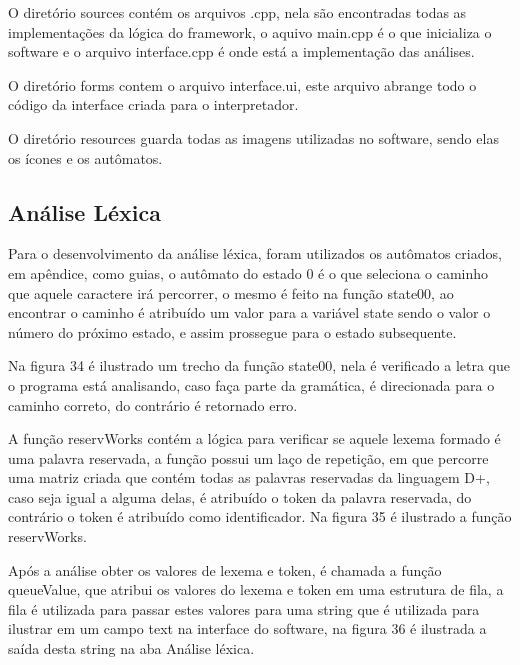 \documentclass[12pt,oneside,a4paper,chapter=TITLE,section=TITLE,sumario=tradicional]{abntex2}
\begin{document}
O diretório sources contém os arquivos .cpp, nela são encontradas todas as implementações da lógica do framework, o aquivo main.cpp é o que inicializa o software e o arquivo interface.cpp é onde está a implementação das análises.

O diretório forms contem o arquivo interface.ui, este arquivo abrange todo o código da interface criada para o interpretador.

O diretório resources guarda todas as imagens utilizadas no software, sendo elas os ícones e os autômatos.

\subsection{Análise Léxica}
\label{subsec:analiselexica}

Para o desenvolvimento da análise léxica, foram utilizados os autômatos criados, em apêndice, como guias, o autômato do estado 0 é o que seleciona o caminho que aquele caractere irá percorrer, o mesmo é feito na função state00, ao encontrar o caminho é atribuído um valor para a variável state sendo o valor o número do próximo estado, e assim prossegue para o estado subsequente.

Na figura 34 é ilustrado um trecho da função state00, nela é verificado a letra que o programa está analisando, caso faça parte da gramática, é direcionada para o caminho correto, do contrário é retornado erro.

\begin{figure}[htb]
\end{figure} 

A função reservWorks contém a lógica para verificar se aquele lexema formado é uma palavra reservada, a função possui um laço de repetição, em que percorre uma matriz criada que contém todas as palavras reservadas da linguagem D+, caso seja igual a alguma delas, é atribuído o token da palavra reservada, do contrário o token é atribuído como identificador. Na figura 35 é ilustrado a função reservWorks.

\begin{figure}[htb]
\end{figure} 

Após a análise obter os valores de lexema e token, é chamada a função queueValue, que atribui os valores do lexema e token em uma estrutura de fila, a fila é utilizada para passar estes valores para uma string que é utilizada para ilustrar em um campo text na interface do software, na figura 36 é ilustrada a saída desta string na aba Análise léxica.
\end{document}
